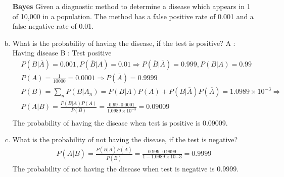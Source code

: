 \documentclass{article}
\begin{document}
\begin{flushleft}
\begin{enumerate}[(a)]
    \newline
\textbf{Bayes}
\newline
Given a diagnostic method to determine a disease which appears in 1 of 10,000 in a population.
The method has a false positive rate of 0.001 and a false negative rate of 0.01.
    \item What is the probability of having the disease, if the test is positive?
    \newline
    A : Having disease B : Test positive
    \begin{align*}
        &P(B|\overline{A}) = 0.001, P(\overline{B}|A) = 0.01 \Longrightarrow P(\overline{B}|\overline{A}) = 0.999, P(B|A) = 0.99 \\
        &P(A) = \frac{1}{10000} = 0.0001 \Longrightarrow P(\overline{A}) = 0.9999 \\
        &P(B) = \sum_n P(B|A_n) = P(B|A)P(A) + P(B|\overline{A})P(\overline{A}) = 1.0989 \times 10^{-3} \Longrightarrow \\
        &P(A|B) = \frac{P(B|A)P(A)}{P(B)} = \frac{0.99 \cdot 0.0001}{1.0989 \times 10^{-3}} = 0.09009 \\
    \end{align*}
    The probability of having the disease when test is positive is 0.09009.
    \item What is the probability of not having the disease, if the test is negative?
    \newline \\
    \begin{align*}
        P(\overline{A}|\overline{B}) = \frac{P(\overline{B}|\overline{A})P(\overline{A})}{P(\overline{B})} = \frac{0.999 \cdot 0.9999}{1 - 1.0989 \times 10{-3}} = 0.9999
    \end{align*}
    The probability of not having the disease when test is negative is 0.9999.
\end{enumerate}
\end{flushleft}
\end{document}
